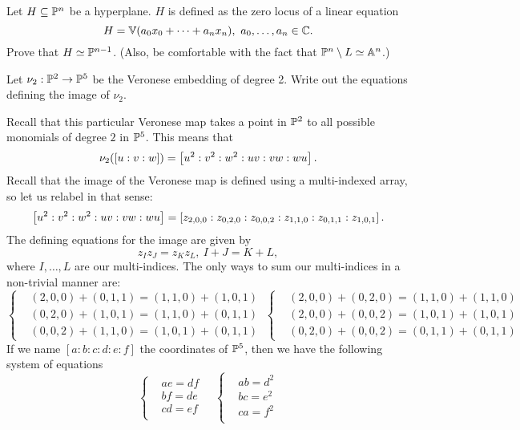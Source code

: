 \documentclass[12pt]{memoir}
\begin{document}
\begin{Ej}
 Let $H\subseteq\mathbb{P}^n$ be a hyperplane. $H$ is defined as the zero locus of a linear equation 
 $$H=\bV(a_0x_0+\dots+a_nx_n),\ a_0,\dots,a_n\in\bC.$$
 Prove that $H\simeq\mathbb{P}^{n-1}$. (Also, be comfortable with the fact that $\mathbb{P}^n\setminus L\simeq\mathbb{A}^n$.) 
\end{Ej}

\begin{ptcbr}
    
  \end{ptcbr}

\begin{Ej}
  Let $\nu_2:\mathbb{P}^2\to\mathbb{P}^5$ be the Veronese embedding of degree 2. Write out the equations defining the image of $\nu_2$.
\end{Ej}

\begin{ptcbr}
  Recall that this particular Veronese map takes a point in $\mathbb{P}^2$ to all possible monomials of degree $2$ in $\mathbb{P}^5$. This means that 
  $$\nu_2(\left\lbrack u:v:w\right\rbrack)=\left\lbrack u^2:v^2:w^2:uv:vw:wu\right\rbrack.$$
  Recall that the image of the Veronese map is defined using a multi-indexed array, so let us relabel in that sense:
  $$\left\lbrack u^2:v^2:w^2:uv:vw:wu\right\rbrack=\left\lbrack z_{2,0,0}:z_{0,2,0}:z_{0,0,2}:z_{1,1,0}:z_{0,1,1}:z_{1,0,1}\right\rbrack.$$
  The defining equations for the image are given by 
  $$z_Iz_J=z_Kz_L,\ I+J=K+L,$$
  where $I,\dots,L$ are our multi-indices. The only ways to sum our multi-indices in a non-trivial manner are:
  $$
  \left\lbrace
  \begin{aligned}
    &(2,0,0)+(0,1,1)=(1,1,0)+(1,0,1)\\
    &(0,2,0)+(1,0,1)=(1,1,0)+(0,1,1)\\
    &(0,0,2)+(1,1,0)=(1,0,1)+(0,1,1)
  \end{aligned}
  \right.\ 
  \left\lbrace
  \begin{aligned}
    &(2,0,0)+(0,2,0)=(1,1,0)+(1,1,0)\\
    &(2,0,0)+(0,0,2)=(1,0,1)+(1,0,1)\\
    &(0,2,0)+(0,0,2)=(0,1,1)+(0,1,1)
  \end{aligned}
  \right.
  $$
  If we name $[a:b:c:d:e:f]$ the coordinates of $\mathbb{P}^5$, then we have the following system of equations 
  $$
  \left\lbrace
  \begin{aligned}
    &ae=df\\
    &bf=de\\
    &cd=ef\\
  \end{aligned}
  \right.\quad 
  \left\lbrace
  \begin{aligned}
    &ab=d^2\\
    &bc=e^2\\
    &ca=f^2\\
  \end{aligned}
  \right.
  $$

\end{ptcbr}
\end{document}
